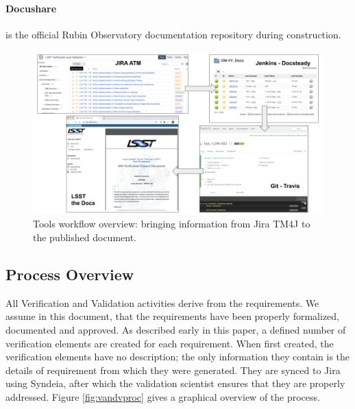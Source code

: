 \paragraph{Docushare}
is the official Rubin Observatory documentation repository during construction.

\begin{figure}
\begin{center}
\includegraphics[width=\textwidth]{imgs/screenshots.png}
 \caption{Tools workflow overview: bringing information from Jira TM4J to the published document.}
 \label{fig:overview}
\end{center}
\end{figure}


\subsection{Process Overview}\label{sec:proc}

All Verification and Validation activities derive from the requirements.
We assume in this document, that the requirements have been properly formalized, documented and approved.
As described early in this paper, a defined number of verification elements are created for each requirement.
When first created, the verification elements have no description;
the only information they contain is the details of requirement from which they were generated.
They are synced to Jira using Syndeia, after which the validation scientist ensures that they are properly addressed.
Figure  \ref{fig:vandvproc} gives a graphical overview of the process.


